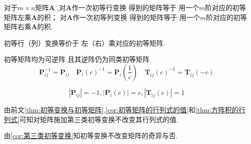 \begin{formal}
\begin{theorem}[初等变换与初等矩阵]\label{thm:初等变换与初等矩阵}
    对于$m \times n$矩阵$\bm{A}$
    ,对$\bm{A}$作一次初等行变换
    得到的矩阵等于
    用一个$m$阶对应的初等
    矩阵左乘$\bm{A}$的积；
    对$\bm{A}$作一次初等列变换
    得到的矩阵等于
    用一个$m$阶对应的初等
    矩阵右乘$\bm{A}$的积.
\end{theorem}
\end{formal}
\begin{red}
\begin{remark}
    初等行（列）变换等价于
左（右）乘对应的初等矩阵.
\end{remark}
\end{red}
\begin{green}
\begin{corollary}[初等矩阵的逆阵]\label{cor:初等矩阵的逆阵}
    初等矩阵均为可逆阵
    且其逆阵仍为同类初等矩阵
    \[
    \bm{P}_{ij}^{-1} = \bm{P}_{ij} \quad
    \bm{P}_i\left(c\right)^{-1}
    = \bm{P}_i\left(\frac{1}{c}\right)
    \quad
    \bm{T}_{ij}\left(c\right)^{-1}
    = \bm{T}_{ij}\left(-c\right)
    \]
\end{corollary}
\end{green}
\begin{green}
\begin{corollary}[初等矩阵的行列式的值]\label{cor:初等矩阵的行列式的值}
    \[
    \left|\bm{P}_{ij}\right|=-1,
    \left|\bm{P}_i\left(c\right)\right|=c,
    \left|\bm{T}_{ij}\left(c\right)\right|=1
    \]
\end{corollary}
\end{green}
\begin{green}
\begin{corollary}[第三类初等变换]\label{cor:第三类初等变换}
    由前文\cref{thm:初等变换与初等矩阵},\cref{cor:初等矩阵的行列式的值}和\cref{thm:方阵积的行列式}可知对矩阵施加第三类初等变换不改变其行列式的值.
\end{corollary}
\end{green}
\begin{green}
\begin{corollary}[初等变换不改变矩阵的奇异性]\label{cor:初等变换不改变矩阵的奇异性}
    由\cref{cor:第三类初等变换}知初等变换不改变矩阵的奇异与否.
\end{corollary}
\end{green}
